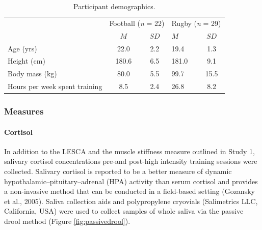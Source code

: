 \documentclass[man,floatsintext]{apa6}
\let\oldparagraph\paragraph
\renewcommand{\paragraph}[1]{\oldparagraph{#1}\mbox{}}
\begin{document}
\begin{table}[H]

\begin{center}
\begin{threeparttable}

\caption{\label{tab:parchar2}Participant demographics.}

\begin{tabular}{lcclc}
\toprule
 & \multicolumn{2}{c}{Football (\emph{n} = 22)} & \multicolumn{2}{c}{Rugby (\emph{n} = 29)} \\
\cmidrule(r){2-3} \cmidrule(r){4-5}
  & $M$ & $SD$ & $M$ & $SD$\\
\midrule
Age (yrs) & 22.0 & 2.2 & 19.4 & 1.3\\
Height (cm) & 180.6 & 6.5 & 181.0 & 9.1\\
Body mass (kg) & 80.0 & 5.5 & 99.7 & 15.5\\
Hours per week spent training & 8.5 & 2.4 & 26.8 & 8.2\\
\bottomrule
\end{tabular}

\end{threeparttable}
\end{center}

\end{table}

\hypertarget{measures-2}{%
\subsubsection{Measures}\label{measures-2}}

\hypertarget{cortisol}{%
\paragraph{Cortisol}\label{cortisol}}

In addition to the LESCA and the muscle stiffness measure outlined in Study 1, salivary cortisol concentrations pre-and post-high intensity training sessions were collected.
Salivary cortisol is reported to be a better measure of dynamic hypothalamic--pituitary--adrenal (HPA) activity than serum cortisol and provides a non-invasive method that can be conducted in a field-based setting (Gozansky et al., 2005).
Saliva collection aids and polypropylene cryovials (Salimetrics LLC, California, USA) were used to collect samples of whole saliva via the passive drool method (Figure \ref{fig:passivedrool}).
\end{document}
